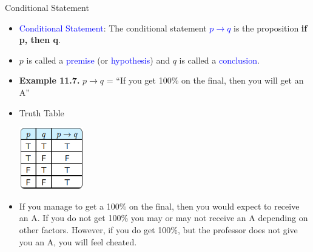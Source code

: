 \documentclass[aspectratio=169]{beamer}
\providecommand{\Blue}[1]{\textcolor{blue}{#1}}
\begin{document}
\begin{frame}[plain]{Conditional Statement}

\begin{itemize}[<+->]
 \item \Blue{Conditional Statement}: The conditional statement \Blue{$p\rightarrow q$} 
   is the proposition {\bf if  p, then q}. 
 \item $p$ is called a \Blue{premise} (or \Blue{hypothesis}) and $q$ is called a 
    \Blue{conclusion}.
      \item {\bf Example 11.7.} $p\rightarrow q$ = ``If you get 100\% on the final, then
          you will get an A''
    
      \item Truth Table 
      
              \begin{center}
                \includegraphics[height=2.7cm]{./img/lecture11-fig6.png}
              \end{center}  
       \item If you manage to get a 100\% on the final, then you would expect to receive an A. 
         If you do not get 100\% you may or may not receive an A depending on 
       other factors. However, if you do get 100\%, 
         but the professor does not give you an A, you will feel cheated. 
  
    \end{itemize}
\end{frame}
\end{document}

